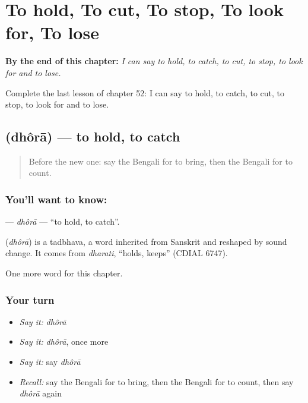 
\chapter{To hold, To cut, To stop, To look for, To lose}
\label{ch:bn-to-hold-to-cut-to-stop-to-look-for-to-lose}

\begin{chapteropening}
\textbf{By the end of this chapter:} \emph{I can say to hold, to catch, to cut, to stop, to look for and to lose.}

Complete the last lesson of chapter 52: I can say to hold, to catch, to cut, to stop, to look for and to lose.
\end{chapteropening}

\section[\texorpdfstring{\bn{ধরা} (dhôrā)}{ধরা (dhôrā)}]{ (dhôrā) — to hold, to catch}

\label{lesson:BN-C52-dhora}



\begin{quote}
Before the new one: say the Bengali for to bring, then the Bengali for to count.
\end{quote}

\subsection*{You'll want to know: }
\textbf{} — \emph{dhôrā} — \textquotedblleft{}to hold, to catch\textquotedblright{}.

\begin{cousinweb}
\textbf{} (\emph{dhôrā}) is a tadbhava, a word inherited from Sanskrit and reshaped by sound change. It comes from \emph{dharati}, \textquotedblleft{}holds, keeps\textquotedblright{} (CDIAL 6747).
\end{cousinweb}

\begin{grammarlens}[title={What you've built}]
One more word for this chapter.
\end{grammarlens}

\subsection*{Your turn}
\begin{itemize}
\raggedright
  \item \emph{Say it:} \emph{dhôrā}
  \item \emph{Say it:} \emph{dhôrā}, once more
  \item \emph{Say it:} say \emph{dhôrā}
  \item \emph{Recall:} say the Bengali for to bring, then the Bengali for to count, then say \emph{dhôrā} again
\end{itemize}

